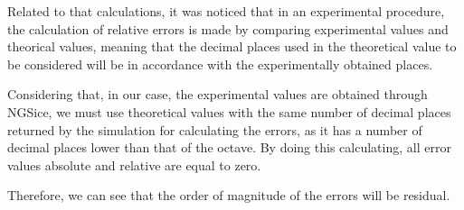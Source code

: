 Related to that calculations, it was noticed that in an experimental procedure, the calculation of relative errors is made by comparing experimental values and theorical values, meaning that the decimal places used in the theoretical value to be considered will be in accordance with the experimentally obtained places.


Considering that, in our case, the experimental values are obtained through NGSice, we must use theoretical values with the same number of decimal places returned by the simulation for calculating the errors, as it has a number of decimal places lower than that of the octave. By doing this calculating, all error values absolute and relative are equal to zero. 

Therefore, we can see that the order of magnitude of the errors will be residual.




